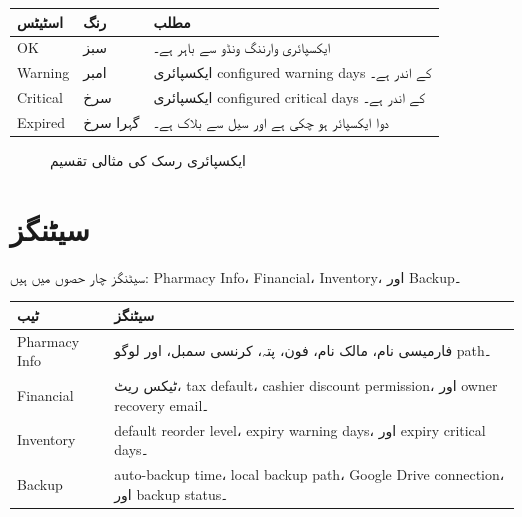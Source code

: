 \documentclass[12pt,a4paper]{article}
\begin{document}
\begin{longtable}{>{\raggedright\arraybackslash}p{3cm}>{\raggedright\arraybackslash}p{3cm}>{\raggedright\arraybackslash}p{7cm}}
\toprule
\textbf{اسٹیٹس} & \textbf{رنگ} & \textbf{مطلب} \\
\midrule
OK & سبز & ایکسپائری وارننگ ونڈو سے باہر ہے۔ \\
Warning & امبر & ایکسپائری configured warning days کے اندر ہے۔ \\
Critical & سرخ & ایکسپائری configured critical days کے اندر ہے۔ \\
Expired & گہرا سرخ & دوا ایکسپائر ہو چکی ہے اور سیل سے بلاک ہے۔ \\
\bottomrule
\end{longtable}

\begin{figure}[H]
\centering
{}
\caption{ایکسپائری رسک کی مثالی تقسیم}
\end{figure}

\section{سیٹنگز}
سیٹنگز چار حصوں میں ہیں: Pharmacy Info، Financial، Inventory، اور Backup۔

\begin{longtable}{>{\raggedright\arraybackslash}p{3.5cm}>{\raggedright\arraybackslash}p{9cm}}
\toprule
\textbf{ٹیب} & \textbf{سیٹنگز} \\
\midrule
Pharmacy Info & فارمیسی نام، مالک نام، فون، پتہ، کرنسی سمبل، اور لوگو path۔ \\
Financial & ٹیکس ریٹ، tax default، cashier discount permission، اور owner recovery email۔ \\
Inventory & default reorder level، expiry warning days، اور expiry critical days۔ \\
Backup & auto-backup time، local backup path، Google Drive connection، اور backup status۔ \\
\bottomrule
\end{longtable}
\end{document}
